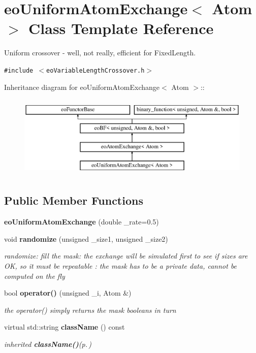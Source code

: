 \section{eo\-Uniform\-Atom\-Exchange$<$ Atom $>$ Class Template Reference}
\label{classeo_uniform_atom_exchange}
Uniform crossover - well, not really, efficient for Fixed\-Length.  


{\tt \#include $<$eo\-Variable\-Length\-Crossover.h$>$}

Inheritance diagram for eo\-Uniform\-Atom\-Exchange$<$ Atom $>$::\begin{figure}[H]
\begin{center}
\leavevmode
\includegraphics[height=4cm]{classeo_uniform_atom_exchange}
\end{center}
\end{figure}
\subsection*{Public Member Functions}
\begin{CompactItemize}
\item 
{\bf eo\-Uniform\-Atom\-Exchange} (double \_\-rate=0.5)\label{classeo_uniform_atom_exchange_a0}

\item 
void {\bf randomize} (unsigned \_\-size1, unsigned \_\-size2)\label{classeo_uniform_atom_exchange_a1}

\begin{CompactList}\small\item\em randomize: fill the mask: the exchange will be simulated first to see if sizes are OK, so it must be repeatable : the mask has to be a private data, cannot be computed on the fly \item\end{CompactList}\item 
bool {\bf operator()} (unsigned \_\-i, Atom \&)\label{classeo_uniform_atom_exchange_a2}

\begin{CompactList}\small\item\em the operator() simply returns the mask booleans in turn \item\end{CompactList}\item 
virtual std::string {\bf class\-Name} () const \label{classeo_uniform_atom_exchange_a3}

\begin{CompactList}\small\item\em inherited {\bf class\-Name()}{\rm (p.\,\pageref{classeo_uniform_atom_exchange_a3})} \item\end{CompactList}\end{CompactItemize}
